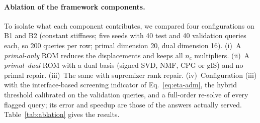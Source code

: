 \documentclass[11pt,a4paper]{article}
\begin{document}
\begin{table}[htbp]
\centering
\footnotesize
\setlength{\tabcolsep}{3pt}
\caption{Mesh-size study (three seeds, 40 test queries each, $r_\lambda = 16$): share of queries above $5\%$ error for SVD, NMF (with median error in brackets) and gIS, and the measured speedup $S$ of the unscreened ROM for NMF and gIS (constant stiffness).}
\label{tab:mesh}

\end{table}

\paragraph{Ablation of the framework components.}
To isolate what each component contributes, we compared four configurations on B1 and B2 (constant stiffness; five seeds with 40 test and 40 validation queries each, so 200 queries per row; primal dimension 20, dual dimension 16). (i)~A \emph{primal-only} ROM reduces the displacements and keeps all $n_c$ multipliers. (ii)~A \emph{primal--dual} ROM with a dual basis (signed SVD, NMF, CPG or gIS) and no primal repair. (iii)~The same with supremizer rank repair. (iv)~Configuration (iii) with the interface-based screening indicator of Eq.~\eqref{eq:eta-adm}, the hybrid threshold calibrated on the validation queries, and a full-order re-solve of every flagged query; its error and speedup are those of the answers actually served. Table~\ref{tab:ablation} gives the results.

\begin{table}[htbp]
\centering
\footnotesize
\setlength{\tabcolsep}{2.5pt}
\caption{Ablation on B1 and B2 (200 queries per row). Median err.: median relative energy error of the served answer; $>5\%$: share of served answers above $5\%$ error; cond.: median condition number of the reduced Schur complement (infinite when singular); speedup: mean full-order time over mean time of the configuration (net of the fallback in the last variant, whose served errors are zero for the flagged queries); Fallback: share of queries re-solved at full order; Missed: accepted queries with error above $5\%$. Speedups come from one timing per query, and models that are identical (for example NMF with and without repair, where repair adds no vector) differ by up to about $10\%$.}
\label{tab:ablation}

\end{table}
\end{document}
